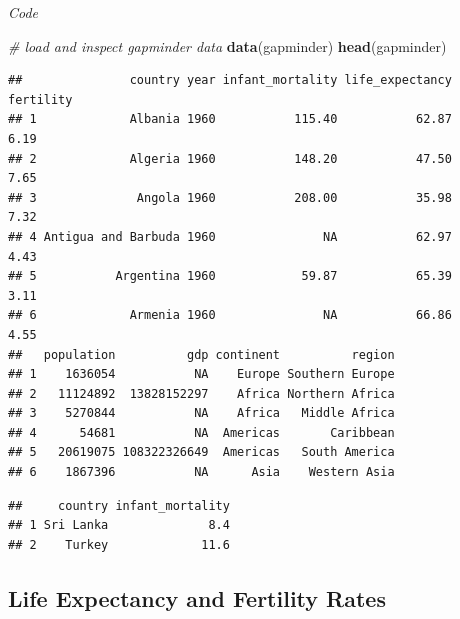 \documentclass[
]{article}
\newenvironment{Shaded}{\begin{snugshade}}{\end{snugshade}}
\newcommand{\CommentTok}[1]{\textcolor[rgb]{0.56,0.35,0.01}{\textit{#1}}}
\newcommand{\DecValTok}[1]{\textcolor[rgb]{0.00,0.00,0.81}{#1}}
\newcommand{\KeywordTok}[1]{\textcolor[rgb]{0.13,0.29,0.53}{\textbf{#1}}}
\newcommand{\NormalTok}[1]{#1}
\newcommand{\OperatorTok}[1]{\textcolor[rgb]{0.81,0.36,0.00}{\textbf{#1}}}
\newcommand{\StringTok}[1]{\textcolor[rgb]{0.31,0.60,0.02}{#1}}
\begin{document}
\emph{Code}

\begin{Shaded}
\begin{Highlighting}[]
\CommentTok{# load and inspect gapminder data}
\KeywordTok{data}\NormalTok{(gapminder)}
\KeywordTok{head}\NormalTok{(gapminder)}
\end{Highlighting}
\end{Shaded}

\begin{verbatim}
##               country year infant_mortality life_expectancy fertility
## 1             Albania 1960           115.40           62.87      6.19
## 2             Algeria 1960           148.20           47.50      7.65
## 3              Angola 1960           208.00           35.98      7.32
## 4 Antigua and Barbuda 1960               NA           62.97      4.43
## 5           Argentina 1960            59.87           65.39      3.11
## 6             Armenia 1960               NA           66.86      4.55
##   population          gdp continent          region
## 1    1636054           NA    Europe Southern Europe
## 2   11124892  13828152297    Africa Northern Africa
## 3    5270844           NA    Africa   Middle Africa
## 4      54681           NA  Americas       Caribbean
## 5   20619075 108322326649  Americas   South America
## 6    1867396           NA      Asia    Western Asia
\end{verbatim}

\begin{Shaded}
\end{Shaded}

\begin{verbatim}
##     country infant_mortality
## 1 Sri Lanka              8.4
## 2    Turkey             11.6
\end{verbatim}

\hypertarget{life-expectancy-and-fertility-rates}{%
\subsection{Life Expectancy and Fertility
Rates}\label{life-expectancy-and-fertility-rates}}
\end{document}
